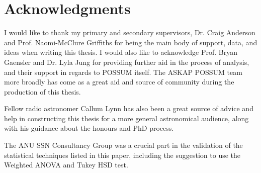 \chapter*{Acknowledgments}

I would like to thank my primary and secondary supervisors, Dr. Craig Anderson and Prof. Naomi-McClure Griffiths for being the main body of support, data, and ideas when writing this thesis. I would also like to acknowledge Prof. Bryan Gaensler and Dr. Lyla Jung for providing further aid in the process of analysis, and their support in regards to POSSUM itself. The ASKAP POSSUM team more broadly has come as a great aid and source of community during the production of this thesis.

Fellow radio astronomer Callum Lynn has also been a great source of advice and help in constructing this thesis for a more general astronomical audience, along with his guidance about the honours and PhD process.

The ANU SSN Consultancy Group was a crucial part in the validation of the statistical techniques listed in this paper, including the suggestion to use the Weighted ANOVA and Tukey HSD test.

\newpage 

\ %

\newpage